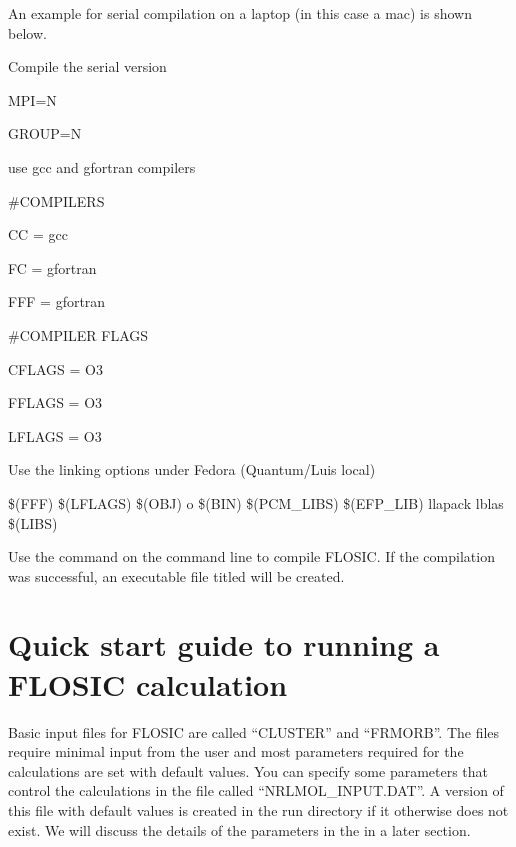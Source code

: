 \documentclass[letterpaper,10pt,english,openany,oneside]{sphinxmanual}
\begin{document}
\sphinxAtStartPar
An example for serial compilation on a laptop (in this case a mac) is shown below.

\sphinxAtStartPar
{} Compile the serial version

\sphinxAtStartPar
MPI=N

\sphinxAtStartPar
GROUP=N

\sphinxAtStartPar
{} use gcc and gfortran compilers

\sphinxAtStartPar
\#COMPILERS

\sphinxAtStartPar
CC = gcc

\sphinxAtStartPar
FC = gfortran

\sphinxAtStartPar
FFF = gfortran

\sphinxAtStartPar
\#COMPILER FLAGS

\sphinxAtStartPar
CFLAGS = \sphinxhyphen{}O3

\sphinxAtStartPar
FFLAGS = \sphinxhyphen{}O3

\sphinxAtStartPar
LFLAGS = \sphinxhyphen{}O3

\sphinxAtStartPar
{} Use the linking options under Fedora (Quantum/Luis local)

\sphinxAtStartPar
\$(FFF) \$(LFLAGS) \$(OBJ) \sphinxhyphen{}o \$(BIN) \$(PCM\_LIBS) \$(EFP\_LIB) \sphinxhyphen{}llapack \sphinxhyphen{}lblas \$(LIBS)

\sphinxAtStartPar
Use the  command on the command line to compile FLOSIC. If the compilation was successful, an executable file titled  will be created.


\chapter{Quick start guide to running a FLOSIC calculation}
\label{\detokenize{docs/setupcal:quick-start-guide-to-running-a-flosic-calculation}}\label{\detokenize{docs/setupcal:setup}}\label{\detokenize{docs/setupcal::doc}}
\sphinxAtStartPar
Basic input files for FLOSIC are called “CLUSTER” and “FRMORB”.
The files require minimal input from the user and most parameters required for the calculations are set with
default values. You can specify some parameters that control the calculations in the file called “NRLMOL\_INPUT.DAT”.
A version of this file with default values is created in the run directory if it otherwise does not exist. We will
discuss the details of the parameters in the  in a later section.
\end{document}
